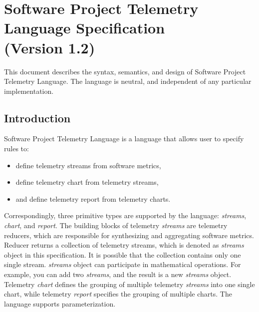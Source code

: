 \chapter{Software Project Telemetry Language Specification\\(Version 1.2)}  
\label{Chapter:TelemetryLanguageSpecification}



This document describes the syntax, semantics, and design of Software Project Telemetry Language. The language is neutral, and independent of any particular implementation.


 
\section{Introduction}  \label{TelemetryLanguageSpecification:Introduction}

Software Project Telemetry Language is a language that allows user to specify rules to:
\begin{itemize}
  \setlength{\itemsep}{0pt}
  \setlength{\parskip}{0pt}
	\item define telemetry streams from software metrics,
  \item define telemetry chart from telemetry streams,
  \item and define telemetry report from telemetry charts.
\end{itemize}
    
Correspondingly, three primitive types are supported by the language: \textit{streams}, \textit{chart}, and \textit{report}. The building blocks of telemetry \textit{streams} are telemetry reducers, which are responsible for synthesizing and aggregating software metrics. Reducer returns a collection of telemetry streams, which is denoted as \textit{streams} object in this specification. It is possible that the collection contains only one single stream. \textit{streams} object can participate in mathematical operations. For example, you can add two \textit{streams}, and the result is a new \textit{streams} object. Telemetry \textit{chart} defines the grouping of multiple telemetry \textit{streams} into one single chart, while telemetry \textit{report} specifies the grouping of multiple charts. The language supports parameterization. 

